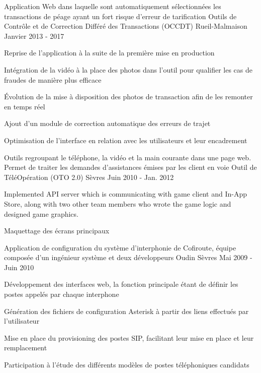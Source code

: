\begin{cventries}
  \cventry
    {Application Web dans laquelle sont automatiquement sélectionnées les transactions de péage ayant un fort risque d'erreur de tarification} %
    {Outils de Contrôle et de Correction Différé des Transactions (OCCDT)} %
    {Rueil-Malmaison} %
    {Janvier 2013 - 2017} %
    {
      \begin{cvitems} %
        \item {Reprise de l'application à la suite de la première mise en production}
        \item {Intégration de la vidéo à la place des photos dans l'outil pour qualifier les cas de fraudes de manière plus efficace}
        \item {Évolution de la mise à disposition des photos de transaction afin de les remonter en temps réel}
        \item {Ajout d'un module de correction automatique des erreurs de trajet}
        \item {Optimisation de l'interface en relation avec les utilisateurs et leur encadrement}
      \end{cvitems}
    } 

  \cventry
    {Outils regroupant le téléphone, la vidéo et la main courante dans une page web. Permet de traiter les demandes d'assistances émises par les client en voie} %
    {Outil de TéléOpération (OTO 2.0)} %
    {Sèvres} %
    {Juin 2010 - Jan. 2012} %
    {
      \begin{cvitems} %
        \item {Implemented API server which is communicating with game client and In-App Store, along with two other team members who wrote the game logic and designed game graphics.}
        \item {Maquettage des écrans principaux}
      \end{cvitems}
    }

  \cventry
    {Application de configuration du système d'interphonie de Cofiroute, équipe composée d'un ingénieur système et deux développeurs} %
    {Oudin} %
    {Sèvres} %
    {Mai 2009 - Juin 2010} %
    {
      \begin{cvitems} %
        \item {Développement des interfaces web, la fonction principale étant de définir les postes appelés par chaque interphone}
        \item {Génération des fichiers de configuration Asterisk à partir des liens effectués par l'utilisateur}
        \item {Mise en place du provisioning des postes SIP, facilitant leur mise en place et leur remplacement}
        \item {Participation à l'étude des différents modèles de postes téléphoniques candidats}
      \end{cvitems}
    }


\end{cventries}
